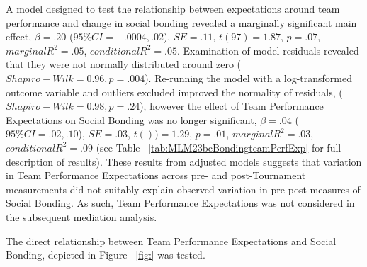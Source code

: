   A model designed to test the relationship between expectations around team performance and change in social bonding revealed a marginally significant main effect, $\beta = .20$ ($95\% CI =  -.0004, .02$), $SE = .11$, $t(97) = 1.87$, $p = .07$, $marginal R^2 = .05$, $conditional R^2 = .05$.  Examination of model residuals revealed that they were not normally distributed around zero ($Shapiro-Wilk = 0.96, p = .004$).  Re-running the model with a log-transformed outcome variable and outliers excluded improved the normality of residuals, ($Shapiro-Wilk = 0.98, p = .24$), however the effect of Team Performance Expectations on Social Bonding was no longer significant, $\beta = .04$ ($95\% CI =  .02, .10$), $SE = .03$, $t()) = 1.29$, $p = .01$, $marginal R^2 = .03$, $conditional R^2 = .09$ (see Table ~\ref{tab:MLM23bcBondingteamPerfExp} for full description of results).
  These results from adjusted models suggests that variation in Team Performance Expectations across pre- and post-Tournament measurements did not suitably explain observed variation in pre-post measures of Social Bonding.  As such, Team Performance Expectations was not considered in the subsequent mediation analysis.

  
  \restoregeometry







  The direct relationship between Team Performance Expectations and Social Bonding, depicted in Figure ~\ref{fig:} was tested.

